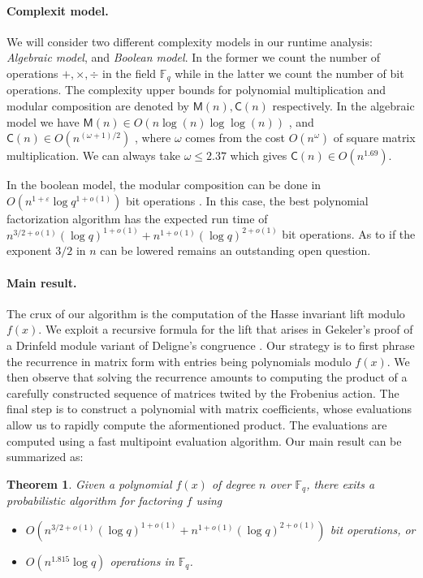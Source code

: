 \documentclass[12pt]{article}
\theoremstyle{plain}
\newtheorem{theorem}{Theorem}
\theoremstyle{definition}
\def\F{\ensuremath{\mathbb{F}}}
\def\MM{\ensuremath{\mathsf{M}}}
\def\CC{\ensuremath{\mathsf{C}}}
\begin{document}
\paragraph{Complexit model.}
We will consider two different complexity models in our runtime analysis: \textit{Algebraic 
model}, and \textit{Boolean model}. In the former we count the number of operations $+, \times, 
\div$ in the field $\F_q$ while in the latter we count the number of bit operations. The complexity 
upper bounds for polynomial multiplication and modular composition are denoted by $\MM(n), \CC(n)$ 
respectively. In the algebraic model we have $\MM(n) \in O(n\log(n)\log\log(n))$
\cite{Schonhage1971}, and $\CC(n) \in O(n^{(\omega+1)/2})$ \cite{BrKu78}, where $\omega$ comes 
from the cost $O(n^\omega)$ of square matrix multiplication. We can always take $\omega \le 2.37$ 
\cite{CoWi90} which gives $\CC(n) \in O(n^{1.69})$.

In the boolean model, the modular composition can be done in $O(n^{1 + \varepsilon}\log q^{1 + 
o(1)})$ bit operations \cite{ku}. In this case, the best polynomial factorization algorithm has the 
expected run time of $n^{3/2+o(1)} (\log q)^{1+o(1)}+n^{1+o(1)} (\log q)^{2+o(1)}$ bit operations. 
As to if the exponent $3/2$ in $n$ can be lowered remains an outstanding open question.


\paragraph{Main result.}
The crux of our algorithm is the computation of the Hasse invariant lift modulo $f(x)$. We exploit 
a recursive formula for the lift that arises in Gekeler's proof of a Drinfeld module variant of 
Deligne's congruence \cite{gek}. Our strategy is to first phrase the recurrence in matrix form with 
entries being polynomials modulo $f(x)$. We then observe that solving the recurrence amounts to 
computing the product of a carefully constructed sequence of matrices twited by the Frobenius 
action. The final step is to construct a polynomial with matrix coefficients, whose evaluations 
allow us to rapidly compute the aformentioned product. The evaluations are computed using a fast 
multipoint evaluation algorithm. Our main result can be summarized as:

\begin{theorem}
	\label{theorem:main}
	Given a polynomial $f(x)$ of degree $n$ over $\F_q$, there exits a probabilistic algorithm for 
	factoring $f$ using
	\begin{itemize}
		\item $O(n^{3/2+o(1)} (\log q)^{1+o(1)} + n^{1+o(1)} (\log q)^{2+o(1)})$ bit operations, or
		\item $O(n^{1.815}\log q)$ operations in $\F_q$.
	\end{itemize}
\end{theorem}
\end{document}
